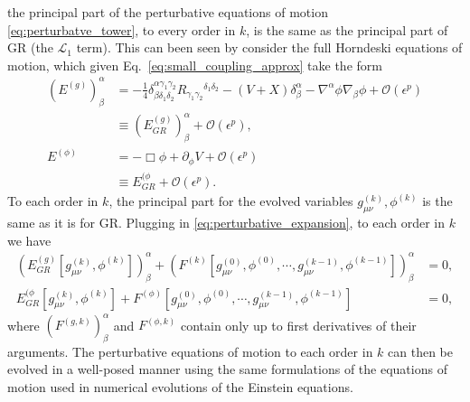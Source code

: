 \documentclass{ws-ijmpd}
\begin{document}
the principal part of the
perturbative equations of motion \eqref{eq:perturbatve_tower}, 
to every order in $k$, is the same as the principal part of GR 
(the $\mathcal{L}_1$ term).
This can been seen by consider the full Horndeski equations of motion,
which given Eq.~\eqref{eq:small_coupling_approx} take the form
\begin{align}
   \left(E^{(g)}\right)^{\alpha}_{\beta}
   &=
   -
   \frac{1}{4}\delta^{\alpha\gamma_1\gamma_2}_{\beta\delta_1\delta_2}
   R_{\gamma_1\gamma_2}{}^{\delta_1\delta_2}
   -
   \left(V+X\right)\delta^{\alpha}_{\beta}
   -
   \nabla^{\alpha}\phi\nabla_{\beta}\phi
   +
   \mathcal{O}\left(\epsilon^p\right)
   \nonumber\\
   &\equiv
   \left(E^{(g)}_{GR}\right)^{\alpha}_{\beta}
   +
   \mathcal{O}\left(\epsilon^p\right)
   ,\\
   E^{(\phi)}
   &=
   -
   \Box\phi
   +
   \partial_{\phi}V
   +
   \mathcal{O}\left(\epsilon^p\right)
   \nonumber\\
   &\equiv
   E^{(\phi}_{GR}
   +
   \mathcal{O}\left(\epsilon^p\right)
   .
\end{align}
To each order in $k$, the principal part for the evolved variables
$g^{(k)}_{\mu\nu},\phi^{(k)}$ is the same as it is for GR.
Plugging in \eqref{eq:perturbative_expansion}, to each order in $k$
we have
\begin{align}
   \left(
      E^{(g)}_{GR}
      \left[g^{(k)}_{\mu\nu},\phi^{(k)}\right]
   \right)^{\alpha}_{\beta}
   +
   \left(F^{(k)}\left[
      g^{(0)}_{\mu\nu},\phi^{(0)},
      \cdots,
      g^{(k-1)}_{\mu\nu},\phi^{(k-1)}
   \right]\right)^{\alpha}_{\beta}
   &=
   0
   ,\\
   E^{(\phi}_{GR}
   \left[g^{(k)}_{\mu\nu},\phi^{(k)}\right]
   +
   F^{(\phi)}\left[
      g^{(0)}_{\mu\nu},\phi^{(0)},
      \cdots,
      g^{(k-1)}_{\mu\nu},\phi^{(k-1)}
   \right]
   &=
   0
   ,
\end{align}
where $\left(F^{(g,k)}\right)^{\alpha}_{\beta}$ and
$F^{(\phi,k)}$ contain only up to first derivatives of their arguments.
The perturbative equations of motion to each order in $k$
can then be evolved in a well-posed manner using the same formulations
of the equations of motion used in numerical evolutions of
the Einstein equations.
\end{document}
